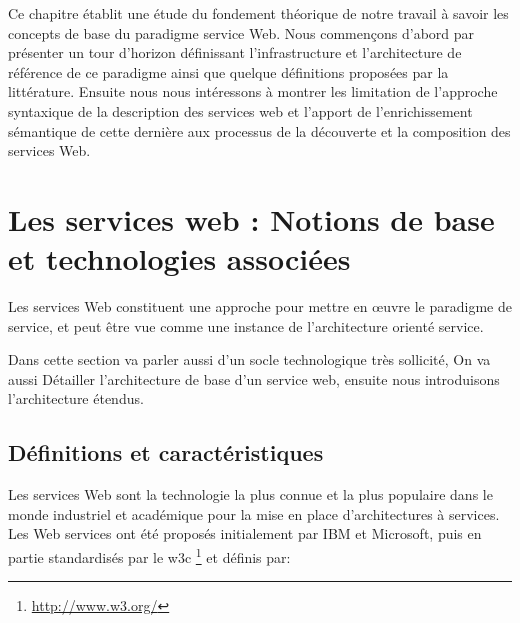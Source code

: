 

    Ce chapitre établit une étude du fondement théorique de notre travail à savoir les concepts de base du paradigme
    service Web.  Nous commençons d'abord par présenter un tour d'horizon définissant l'infrastructure et
    l'architecture de référence de ce paradigme ainsi que quelque définitions proposées par la littérature. Ensuite
    nous nous intéressons à montrer les limitation de l'approche syntaxique de la description des services web et l'apport
    de l'enrichissement sémantique de cette dernière aux processus de la découverte et la composition des services Web.\\

\section{Les services web : Notions de base et technologies associées} 
    Les services Web constituent une approche pour mettre en œuvre le paradigme de service, et peut être vue comme
    une instance de l'architecture orienté service.

    Dans cette section va parler aussi d'un socle technologique très sollicité, On va aussi Détailler l'architecture de base 
    d'un service web, ensuite nous introduisons l'architecture étendus.

    \subsection{Définitions et caractéristiques}
	Les services Web sont la technologie la plus connue et la plus populaire dans le monde industriel et
	académique pour la mise en place d’architectures à services. 
	Les Web services ont été proposés initialement par IBM \cite{kreger2001web} et Microsoft, puis en partie 
	standardisés par le \acrshort{w3c} \footnote{\url{http://www.w3.org/}} et définis \cite{WSA} par:\\


